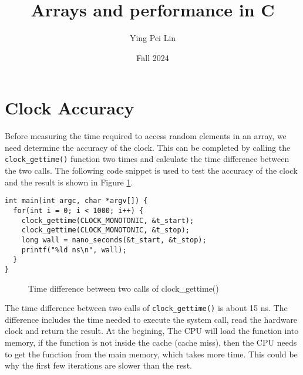 \documentclass[a4paper,11pt]{article}
\begin{document}
\title{
    \textbf{Arrays and performance in C}
}
\author{Ying Pei Lin}
\date{Fall 2024}

\maketitle

\section*{Clock Accuracy}

Before measuring the time required to access random elements in an array, we need determine the 
accuracy of the clock. This can be completed by calling the {\tt clock\_gettime()} function two times and 
calculate the time difference between the two calls. The following code snippet is used to test the accuracy 
of the clock and the result is shown in Figure \ref{fig:clock_accuracy}. 

\begin{verbatim}
int main(int argc, char *argv[]) {
  for(int i = 0; i < 1000; i++) {
    clock_gettime(CLOCK_MONOTONIC, &t_start);
    clock_gettime(CLOCK_MONOTONIC, &t_stop);
    long wall = nano_seconds(&t_start, &t_stop);
    printf("%ld ns\n", wall); 
  }
}
\end{verbatim}

\begin{figure}[h]
  \centering
  \caption{Time difference between two calls of clock\_gettime()}
  \label{fig:clock_accuracy}
\end{figure}

The time difference between two calls of {\tt clock\_gettime()} is about 15 ns. The difference
includes the time needed to execute the system call, read the hardware clock and return the result. 
At the begining, The CPU will load the function into memory, if the function 
is not inside the cache (cache miss), then the CPU needs to get the function from the main memory, 
which takes more time. This could be why the first few iterations are slower than the rest.
\end{document}
